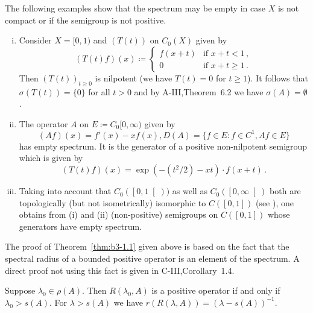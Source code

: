 The following examples show that the spectrum may be empty in case $X$ is not compact or if the semigroup is not positive.
\begin{examples}\label{ex:b3-1.2}

\begin{enumerate}[(i), wide]	
\item  
Consider $X = [0,1)$ and $(T(t))$ on $C_{0}(X)$ given by
%
\begin{equation}\label{eq:b3-1.7}
	(T(t)f)(x) \coloneqq \begin{cases} 
		f(x+t) & \text{if } x+t < 1\,, \\
		0 & \text{if } x+t \geq 1\,.
	\end{cases}
\end{equation}
Then $(T(t))_{t\geq 0}$ is nilpotent (we have $T(t) = 0$ for $t \geq 1$).
It follows that $\sigma(T(t)) = \{0\}$ for all $t > 0$ and by A-III,Theorem~6.2 we have $\sigma(A) = \emptyset$.

\item 
The operator $A$ on $E \coloneqq C_{0}[0,\infty)$ given by
\begin{equation}\label{eq:b3-1.8}
	(Af)(x) = f'(x) - xf(x), D(A) = \{f \in E : f \in C^1, Af \in E\}
\end{equation}
has empty spectrum.
It is the generator of a positive non-nilpotent semigroup which is given by
\begin{equation}\label{eq:b3-1.9}
	(T(t)f)(x) = \exp(-(t^2/2) - xt) \cdot f(x+t)\,.
\end{equation}
	
\item 
Taking into account that $C_{0}(\left[0,1\right[))$ as well as 
$C_{0}(\left[0,\infty\right[)$ both are topologically (but not isometrically) isomorphic to $C(\left[0,1\right])$ (see \citet[Section~21.5]{semadeni:1971}), one obtains from (i) and (ii) (non-positive) semigroups on $C(\left[0,1\right])$ whose generators have empty spectrum.
\end{enumerate}
\end{examples}
The proof of Theorem~\ref{thm:b3-1.1} given above is based on the fact that the spectral radius of a bounded positive operator is an element of the spectrum.
A direct proof not using this fact is given in C-III,Corollary~1.4.
\begin{corollary}\label{cor:b3-1.3}
	Suppose $\lambda_0 \in \rho(A)$.
	Then $R(\lambda_0,A)$ is a positive operator if and only if $\lambda_0 > s(A)$.
	For $\lambda > s(A)$ we have $r(R(\lambda,A)) = (\lambda - s(A))^{-1}$.
\end{corollary}
